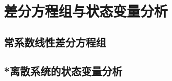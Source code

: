 \section{差分方程组与状态变量分析}\label{sec:Difference_Equation}

\subsection{常系数线性差分方程组}\label{sub:difference_equation_system}

\subsection{*离散系统的状态变量分析}\label{sub:discrete_state_variable}


